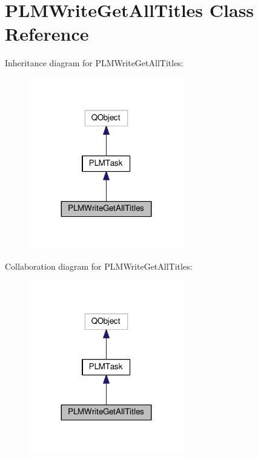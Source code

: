 \hypertarget{class_p_l_m_write_get_all_titles}{}\section{P\+L\+M\+Write\+Get\+All\+Titles Class Reference}
\label{class_p_l_m_write_get_all_titles}


Inheritance diagram for P\+L\+M\+Write\+Get\+All\+Titles\+:\nopagebreak
\begin{figure}[H]
\begin{center}
\leavevmode
\includegraphics[width=191pt]{class_p_l_m_write_get_all_titles__inherit__graph}
\end{center}
\end{figure}


Collaboration diagram for P\+L\+M\+Write\+Get\+All\+Titles\+:\nopagebreak
\begin{figure}[H]
\begin{center}
\leavevmode
\includegraphics[width=191pt]{class_p_l_m_write_get_all_titles__coll__graph}
\end{center}
\end{figure}
